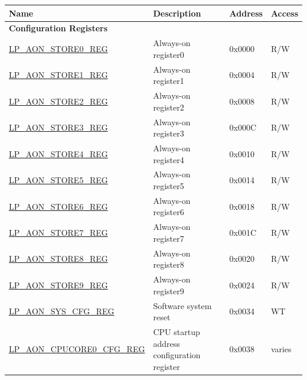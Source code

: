 \begin{longtable}{ | l | p{7cm} | p{1.2cm} | p{1.5cm} | }
\hline\rowcolor{lightgray}
\textbf{Name} & \textbf{Description} &  \textbf{Address} & \textbf{Access} \\ \hline
\endhead
\multicolumn{4}{|l|}{\textbf{Configuration Registers}} \\ \hline
\hyperref[regdesc:LPAONSTORENREG]{LP\_AON\_STORE0\_REG} & Always-on register0 & 0x0000 & R/W \\ \hline
\hyperref[regdesc:LPAONSTORENREG]{LP\_AON\_STORE1\_REG} & Always-on register1 & 0x0004 & R/W \\ \hline
\hyperref[regdesc:LPAONSTORENREG]{LP\_AON\_STORE2\_REG} & Always-on register2 & 0x0008 & R/W \\ \hline
\hyperref[regdesc:LPAONSTORENREG]{LP\_AON\_STORE3\_REG} & Always-on register3 & 0x000C & R/W \\ \hline
\hyperref[regdesc:LPAONSTORENREG]{LP\_AON\_STORE4\_REG} & Always-on register4 & 0x0010 & R/W \\ \hline
\hyperref[regdesc:LPAONSTORENREG]{LP\_AON\_STORE5\_REG} & Always-on register5 & 0x0014 & R/W \\ \hline
\hyperref[regdesc:LPAONSTORENREG]{LP\_AON\_STORE6\_REG} & Always-on register6 & 0x0018 & R/W \\ \hline
\hyperref[regdesc:LPAONSTORENREG]{LP\_AON\_STORE7\_REG} & Always-on register7 & 0x001C & R/W \\ \hline
\hyperref[regdesc:LPAONSTORENREG]{LP\_AON\_STORE8\_REG} & Always-on register8 & 0x0020 & R/W \\ \hline
\hyperref[regdesc:LPAONSTORENREG]{LP\_AON\_STORE9\_REG} & Always-on register9 & 0x0024 & R/W \\ \hline
\hyperref[regdesc:LPAONSYSCFGREG]{LP\_AON\_SYS\_CFG\_REG} & Software system reset & 0x0034 & WT \\ \hline
\hyperref[regdesc:LPAONCPUCORE0CFGREG]{LP\_AON\_CPUCORE0\_CFG\_REG} & CPU startup address configuration register & 0x0038 & varies \\ \hline
\end{longtable}
